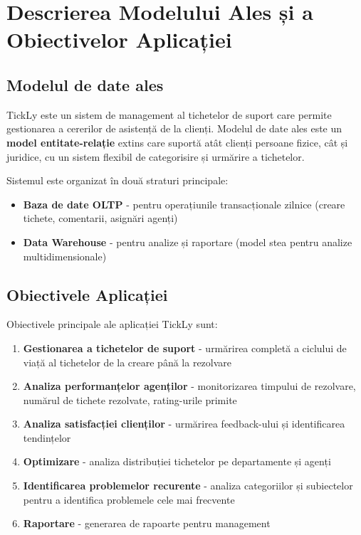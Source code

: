 \chapter{Descrierea Modelului Ales și a Obiectivelor Aplicației}
\label{sec:descriere}

\section{Modelul de date ales}

TickLy este un sistem de management al tichetelor de suport care permite gestionarea a cererilor de asistență de la clienți. Modelul de date ales este un \textbf{model entitate-relație} extins care suportă atât clienți persoane fizice, cât și juridice, cu un sistem flexibil de categorisire și urmărire a tichetelor.

Sistemul este organizat în două straturi principale:
\begin{itemize}
    \item \textbf{Baza de date OLTP} - pentru operațiunile transacționale zilnice (creare tichete, comentarii, asignări agenți)
    \item \textbf{Data Warehouse} - pentru analize și raportare (model stea pentru analize multidimensionale)
\end{itemize}

\section{Obiectivele Aplicației}

Obiectivele principale ale aplicației TickLy sunt:

\begin{enumerate}
    \item \textbf{Gestionarea a tichetelor de suport} - urmărirea completă a ciclului de viață al tichetelor de la creare până la rezolvare
    \item \textbf{Analiza performanțelor agenților} - monitorizarea timpului de rezolvare, numărul de tichete rezolvate, rating-urile primite
    \item \textbf{Analiza satisfacției clienților} - urmărirea feedback-ului și identificarea tendințelor
    \item \textbf{Optimizare} - analiza distribuției tichetelor pe departamente și agenți
    \item \textbf{Identificarea problemelor recurente} - analiza categoriilor și subiectelor pentru a identifica problemele cele mai frecvente
    \item \textbf{Raportare} - generarea de rapoarte pentru management
\end{enumerate}
